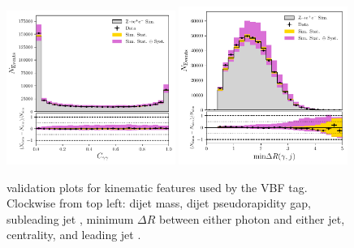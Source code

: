 \begin{figure}[h!]
\begin{center}
    \end{center}
    \begin{center}
        \includegraphics[width=0.49\textwidth]{figures/appendix_zee/centrality_zee_LPS.pdf}
        \includegraphics[width=0.49\textwidth]{figures/appendix_zee/min_delta_r_jgam_zee_LPS.pdf}
    \end{center}
    \caption{\Zee validation plots for kinematic features used by the VBF tag. Clockwise from top left: dijet mass, dijet pseudorapidity gap, subleading jet \pt, 
             minimum $\Delta{R}$ between either photon and either jet, centrality, and leading jet \pt.}
\end{figure}

